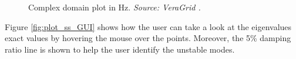 \begin{figure}[H]
\begin{minipage}{0.49\textwidth}
    \caption{Complex domain plot in Hz. \textit{Source: VeraGrid \cite{veragrid}.}}
    \label{fig:plot_ss_Hz_GUI}
  \end{minipage}
\end{figure}

Figure \ref{fig:plot_ss_GUI} shows how the user can take a look at the eigenvalues exact values
by hovering the mouse over the points. Moreover, the 5\% damping ratio line is shown to help the user identify
the unstable modes. 








